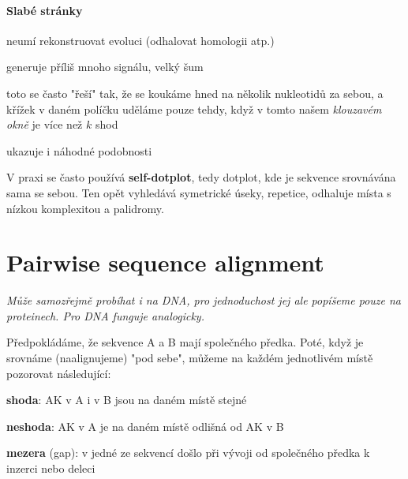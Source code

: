 \documentclass[DIV=8]{scrreprt}
\begin{document}
\paragraph{Slabé stránky}
\begin{myItemize}[nosep]
    \item neumí rekonstruovat evoluci (odhalovat homologii atp.)
    \item generuje příliš mnoho signálu, velký šum
\begin{myItemize}[nosep]
    \item toto se často "řeší" tak, že se koukáme hned na několik nukleotidů za sebou, a křížek v daném políčku uděláme pouze tehdy, když v tomto našem \emph{klouzavém okně} je více než \(k\) shod
\end{myItemize}

    \item ukazuje i náhodné podobnosti
\end{myItemize}



V praxi se často používá \textbf{self-dotplot}, tedy dotplot, kde je sekvence srovnávána sama se sebou. Ten opět vyhledává symetrické úseky, repetice, odhaluje místa s nízkou komplexitou a palidromy.

\section{Pairwise sequence alignment} \label{Pairwise sequence alignment} \FloatBarrier


\emph{Může samozřejmě probíhat i na DNA, pro jednoduchost jej ale popíšeme pouze na proteinech. Pro DNA funguje analogicky.}

Předpokládáme, že sekvence A a B mají společného předka. Poté, když je srovnáme (naalignujeme) "pod sebe", můžeme na každém jednotlivém místě pozorovat následující:
\begin{myItemize}[nosep]
    \item \textbf{shoda}: AK v A i v B jsou na daném místě stejné
    \item \textbf{neshoda}: AK v A je na daném místě odlišná od AK v B
    \item \textbf{mezera} (gap): v jedné ze sekvencí došlo při vývoji od společného předka k inzerci nebo deleci
\end{myItemize}



\end{document}
